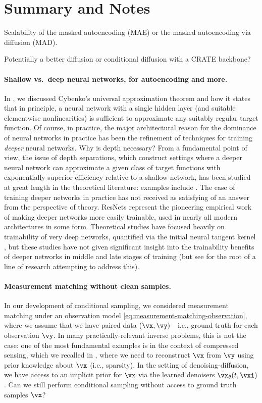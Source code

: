 \documentclass[../../book-main.tex]{subfiles}
\begin{document}
\section{Summary and Notes}
Scalability of the masked autoencoding (MAE) or the masked
autoencoding via diffusion (MAD).

Potentially a better diffusion or conditional diffusion  with a CRATE backbone?


\paragraph{Shallow vs.\ deep neural networks, for autoencoding and more.}
In , we discussed Cybenko's universal approximation
theorem and how it states that in principle, a neural network with a single
hidden layer (and suitable elementwise nonlinearities) is sufficient to
approximate any suitably regular target function. Of course, in practice, the
major architectural reason for the dominance of neural networks in practice has
been the refinement of techniques for training \textit{deeper} neural networks.
Why is depth necessary?
From a fundamental point of view, the issue of depth separations, which
construct settings where a deeper neural network can approximate a given class
of target functions with exponentially-superior efficiency relative to a shallow
network,
has been studied at great length in the theoretical literature:
examples include \cite{Telgarsky2016-sn,Bresler2020-xy,Venturi2021-qc}. 
The ease of training deeper
networks in practice has not received as satisfying of an answer from the
perspective of theory. 
ResNets \cite{he2016deep} represent the pioneering empirical work of
making deeper networks more easily trainable, used in nearly all modern
architectures in some form. Theoretical studies have focused heavily on
trainability of very deep networks, quantified via the initial neural tangent
kernel \cite{Buchanan2021-sj,Martens2021-cx}, but these studies have not given
significant insight into the trainability benefits of deeper networks in middle
and late stages of training (but see \cite{Yang2021-gw} for the root of a line
of research attempting to address this).

\paragraph{Measurement matching without clean samples.} In our development of
conditional sampling, we considered measurement matching under an observation
model \eqref{eq:measurement-matching-observation}, where we assume that we have
paired data $(\vx, \vy)$---i.e., ground truth for each observation $\vy$.
In many practically-relevant inverse problems, this is not the case: one of the
most fundamental examples is in the context of compressed sensing, which we
recalled in , where we need to reconstruct $\vx$ from $\vy$
using prior knowledge about $\vx$ (i.e., sparsity).
In the setting of denoising-diffusion, we have access to an implicit prior for
$\vx$ via the learned denoisers $\bar{\vx}_{\theta}(t, \vxi)$. Can we still perform 
conditional sampling without access to ground truth samples $\vx$?
\end{document}
